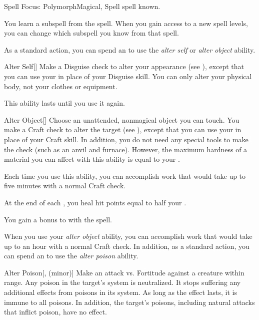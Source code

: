    \begin{feat}{Spell Focus: Polymorph}{Magical, Spell}
        \featpre {} spell known.

         You learn a subspell from the  spell.
        When you gain access to a new spell levels, you can change which subspell you know from that spell.

         As a standard action, you can spend an  to use the \textit{alter self} or \textit{alter object} ability.
        \begin{ability}{Alter Self}[]
            Make a Disguise check to alter your appearance (see ), except that you can use your  in place of your Disguise skill.
            You can only alter your physical body, not your clothes or equipment.

            This ability lasts until you use it again.
        \end{ability}

        \begin{ability}{Alter Object}[]
            Choose an unattended, nonmagical object you can touch.
            You make a Craft check to alter the target (see ), except that you can use your  in place of your Craft skill.
            In addition, you do not need any special tools to make the check (such as an anvil and furnace).
            However, the maximum hardness of a material you can affect with this ability is equal to your .

            Each time you use this ability, you can accomplish work that would take up to five minutes with a normal Craft check.
        \end{ability}

         At the end of each , you heal hit points equal to half your .

         You gain a  bonus to  with the  spell.

         When you use your \textit{alter object} ability, you can accomplish work that would take up to an hour with a normal Craft check.
        In addition, as a standard action, you can spend an  to use the \textit{alter poison} ability.
        \begin{ability}{Alter Poison}[,  (minor)]
            Make an attack vs. Fortitude against a creature within \rngclose range.
            \hit Any poison in the target's system is neutralized.
            It stops suffering any additional effects from poisons in its system.
            As long as the effect lasts, it is immune to all poisons.
            In addition, the target's  poisons, including natural attacks that inflict poison, have no effect.
        \end{ability}


\end{feat}
